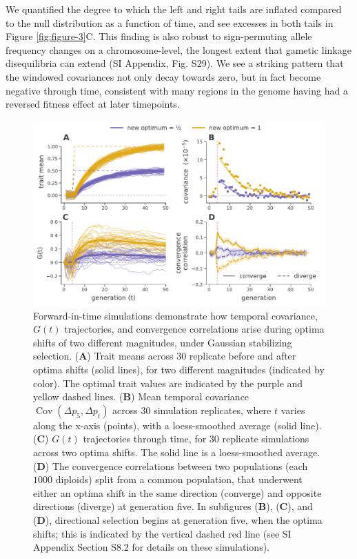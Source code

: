 \documentclass[9pt,twocolumn,twoside]{pnas-new}
\DeclareMathOperator{\cov}{Cov}
\begin{document}
We quantified the degree to which the left and right tails are inflated
compared to the null distribution as a function of time, and see excesses in
both tails in Figure \ref{fig:figure-3}C. This finding is also robust to
sign-permuting allele frequency changes on a chromosome-level, the longest
extent that gametic linkage disequilibria can extend (SI Appendix, Fig. S29).
We see a striking pattern that the windowed covariances not only decay towards
zero, but in fact become negative through time, consistent with many regions in
the genome having had a reversed fitness effect at later timepoints.

\begin{figure}
  \centering
  \includegraphics[width=15cm]{figure-4.pdf}

  \caption{Forward-in-time simulations demonstrate how temporal covariance,
    $G(t)$ trajectories, and convergence correlations arise during optima
    shifts of two different magnitudes, under Gaussian stabilizing selection.
    ({\bf A}) Trait means across 30 replicate before and after optima shifts
    (solid lines), for two different magnitudes (indicated by color). The
    optimal trait values are indicated by the purple and yellow dashed lines.
    ({\bf B}) Mean temporal covariance $\cov(\Delta p_5, \Delta p_t)$ across 30
    simulation replicates, where $t$ varies along the x-axis (points), with a
    loess-smoothed average (solid line). ({\bf C}) $G(t)$ trajectories through
    time, for 30 replicate simulations across two optima shifts. The solid line
    is a loess-smoothed average. ({\bf D}) The convergence correlations between
    two populations (each $1000$ diploids) split from a common population, that
    underwent either an optima shift in the same direction (converge) and
    opposite directions (diverge) at generation five. In subfigures ({\bf B}),
    ({\bf C}), and ({\bf D}), directional selection begins at generation five,
    when the optima shifts; this is indicated by the vertical dashed red line
    (see SI Appendix Section S8.2 for details on these
    simulations).}

  \label{fig:figure-4}
\end{figure}
\end{document}
